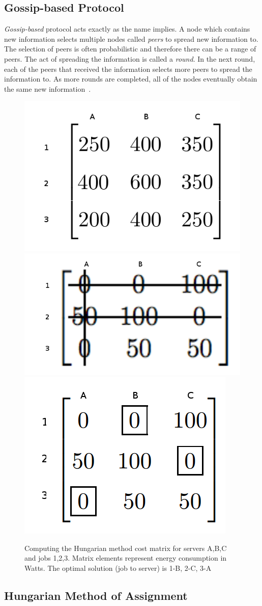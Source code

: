 \documentclass{sig-alternate}
\begin{document}
\subsection{Gossip-based Protocol}
\label{sec:GBP}

\emph{Gossip-based} protocol acts exactly as the name implies. A node which contains new information selects multiple nodes called \emph{peers} to spread new information to. The selection of peers is often probabilistic and therefore there can be a range of peers. The act of spreading the information is called a \emph{round}. In the next round, each of the peers that received the information selects more peers to spread the information to. As more rounds are completed, all of the nodes eventually obtain the same new information~\cite{Yanggratoke}.

\begin{figure}[tb]
 \centering
 \includegraphics[height=0.25 \textwidth]{s}
 \includegraphics[height=0.20 \textwidth]{s2}
 \includegraphics[height=0.25 \textwidth]{s3}
 \caption{Computing the Hungarian method cost matrix for servers A,B,C and jobs 1,2,3. Matrix elements represent energy consumption in Watts. The optimal solution (job to server) is 1-B, 2-C, 3-A}
 \label{fig:HMA}
\end{figure}
\pagebreak
\subsection{Hungarian Method of Assignment}
\label{sec:HMA}
\end{document}
